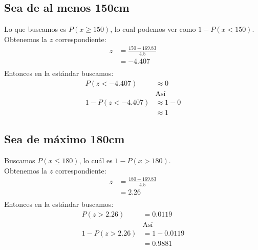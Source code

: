 \documentclass[12pt]{article}
\begin{document}
\subsection{Sea de al menos 150cm}
Lo que buscamos es $P(x\geq150)$, lo cual podemos ver como $1-P(x<150)$.\\
Obtenemos la $z$ correspondiente:
\begin{equation}
\begin{split}
z &= \frac{150 - 169.83}{4.5}\\
&= -4.407\\
\end{split}
\end{equation}
Entonces en la estándar buscamos: 
\begin{equation}
\begin{split}
P(z < -4.407)&\approx 0\\
&\text{Así}\\
1 - P(z < -4.407)&\approx 1-0\\
&\approx 1
\end{split}
\end{equation}
\subsection{Sea de máximo 180cm}
Buscamos $P(x \leq 180)$, lo cuál es $1 - P(x > 180)$.\\
Obtenemos la $z$ correspondiente:
\begin{equation}
\begin{split}
z &= \frac{180 - 169.83}{4.5}\\
&= 2.26\\
\end{split}
\end{equation}
Entonces en la estándar buscamos: 
\begin{equation}
\begin{split}
P(z > 2.26)&= 0.0119\\
&\text{Así}\\
1 - P(z > 2.26)&=  1 - 0.0119\\
&= 0.9881\\
\end{split}
\end{equation}
\end{document}
